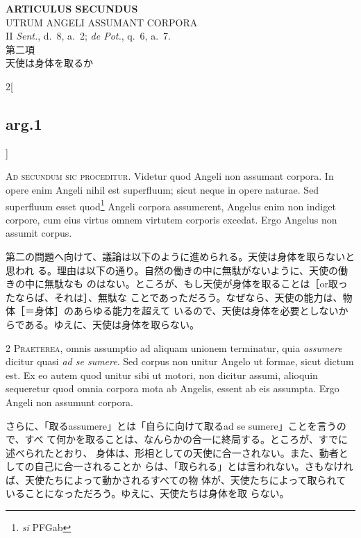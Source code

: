 \documentclass[paper=a4paper,fontsize=10pt,jafontsize=9pt,titlepage]{jlreq}
\begin{document}
\newpage
{}
{}
\setcounter{section}{2}
\setcounter{subsection}{0}


\begin{center}
 {\Large {\bfseries ARTICULUS SECUNDUS}}\\
 {\large UTRUM ANGELI ASSUMANT CORPORA}\\
 {\footnotesize II {\itshape Sent.}, d.~8, a.~2; {\itshape de Pot.},
 q.~6, a.~7.}\\
 {\Large 第二項\\天使は身体を取るか}
\end{center}

\begin{paracol}{2}[\subsection{arg.1}]

{\huge A}{\scshape d secundum sic proceditur}. Videtur quod
Angeli non assumant corpora. In opere enim Angeli nihil est superfluum;
sicut neque in opere naturae. Sed superfluum esset
 quod\footnote{{\itshape si} PFGab} Angeli corpora
assumerent, Angelus enim non indiget corpore, cum eius virtus omnem
virtutem corporis excedat. Ergo Angelus non assumit corpus.

\switchcolumn

第二の問題へ向けて、議論は以下のように進められる。天使は身体を取らないと思われ
る。理由は以下の通り。自然の働きの中に無駄がないように、天使の働きの中に無駄なも
のはない。ところが、もし天使が身体を取ることは［or取ったならば、それは］、無駄な
ことであっただろう。なぜなら、天使の能力は、物体［＝身体］のあらゆる能力を超えて
いるので、天使は身体を必要としないからである。ゆえに、天使は身体を取らない。


{\scshape 2 Praeterea}, omnis assumptio ad aliquam unionem terminatur,
quia {\itshape assumere} dicitur quasi {\itshape ad se sumere}. Sed
corpus non unitur Angelo ut formae, sicut dictum est. Ex eo autem quod
unitur sibi ut motori, non dicitur assumi, alioquin sequeretur quod
omnia corpora mota ab Angelis, essent ab eis assumpta. Ergo Angeli non
assumunt corpora.

\switchcolumn

さらに、「取るassumere」とは「自らに向けて取るad se sumere」ことを言うので、すべ
て何かを取ることは、なんらかの合一に終局する。ところが、すでに述べられたとおり、
身体は、形相としての天使に合一されない。また、動者としての自己に合一されることか
らは、「取られる」とは言われない。さもなければ、天使たちによって動かされるすべての物
体が、天使たちによって取られていることになっただろう。ゆえに、天使たちは身体を取
らない。


\end{paracol}
\end{document}
